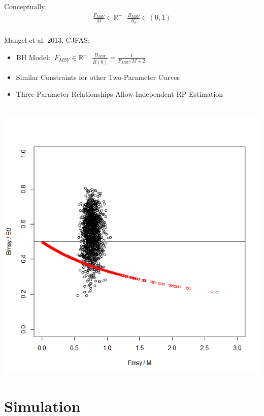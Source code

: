 \documentclass[ xcolor = pdftex, dvipsnames, table ]{beamer}
\begin{document}
\begin{frame}
{\begin{minipage}[h!]{0.59\textwidth}
Conceptually:
\begin{align*}
\frac{F_{MSY}}{M}\in\mathbb{R}^+ ~~~ \frac{B_{MSY}}{B_{0}}\in\left(0, 1\right)
\end{align*}
$~$\\
Mangel et al. 2013, CJFAS:
\begin{itemize}
        \item BH Model: $~ F_{MSY}\in\mathbb{R}^+ ~~~ \frac{B_{MSY}}{\bar B(0)}=\frac{1}{F_{MSY}/M+2}$
        \item Similar Constraints for other Two-Parameter Curves %
        \item Three-Parameter Relationships Allow Independent RP Estimation
\end{itemize}
\end{minipage}
\begin{minipage}[h!]{0.39\textwidth}
$~$\\
\hspace*{-0.3cm}
\includegraphics[width=1.4\textwidth]{cjasFig.png}
\end{minipage}
}
\end{frame}

%
\section{Simulation}
\end{document}
